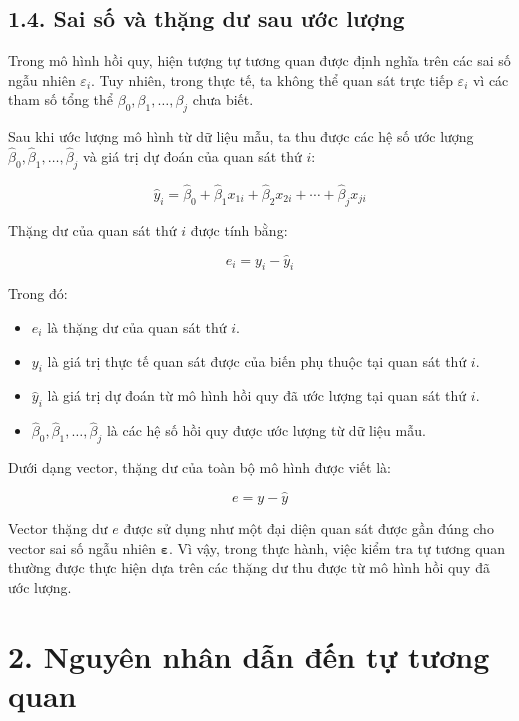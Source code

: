 \documentclass[12pt,a4paper]{article}
\begin{document}
\subsection{1.4. Sai số và thặng dư sau ước lượng}

Trong mô hình hồi quy, hiện tượng tự tương quan được định nghĩa trên các sai số ngẫu nhiên $\varepsilon_i$. Tuy nhiên, trong thực tế, ta không thể quan sát trực tiếp $\varepsilon_i$ vì các tham số tổng thể $\beta_0,\beta_1,\ldots,\beta_j$ chưa biết.

Sau khi ước lượng mô hình từ dữ liệu mẫu, ta thu được các hệ số ước lượng
$\hat{\beta}_0,\hat{\beta}_1,\ldots,\hat{\beta}_j$ và giá trị dự đoán của quan sát thứ $i$:

\[
\hat{y}_i
=
\hat{\beta}_0
+
\hat{\beta}_1 x_{1i}
+
\hat{\beta}_2 x_{2i}
+
\cdots
+
\hat{\beta}_j x_{ji}
\]

Thặng dư của quan sát thứ $i$ được tính bằng:

\[
e_i
=
y_i-\hat{y}_i
\]

Trong đó:

\begin{itemize}
    \item $e_i$ là thặng dư của quan sát thứ $i$.
    
    \item $y_i$ là giá trị thực tế quan sát được của biến phụ thuộc tại quan sát thứ $i$.
    
    \item $\hat{y}_i$ là giá trị dự đoán từ mô hình hồi quy đã ước lượng tại quan sát thứ $i$.
    
    \item $\hat{\beta}_0,\hat{\beta}_1,\ldots,\hat{\beta}_j$ là các hệ số hồi quy được ước lượng từ dữ liệu mẫu.
\end{itemize}

Dưới dạng vector, thặng dư của toàn bộ mô hình được viết là:

\[
e
=
y-\hat{y}
\]

Vector thặng dư $e$ được sử dụng như một đại diện quan sát được gần đúng cho vector sai số ngẫu nhiên \(\boldsymbol{\varepsilon}\). Vì vậy, trong thực hành, việc kiểm tra tự tương quan thường được thực hiện dựa trên các thặng dư thu được từ mô hình hồi quy đã ước lượng. 

\section{2. Nguyên nhân dẫn đến tự tương quan}
\end{document}
